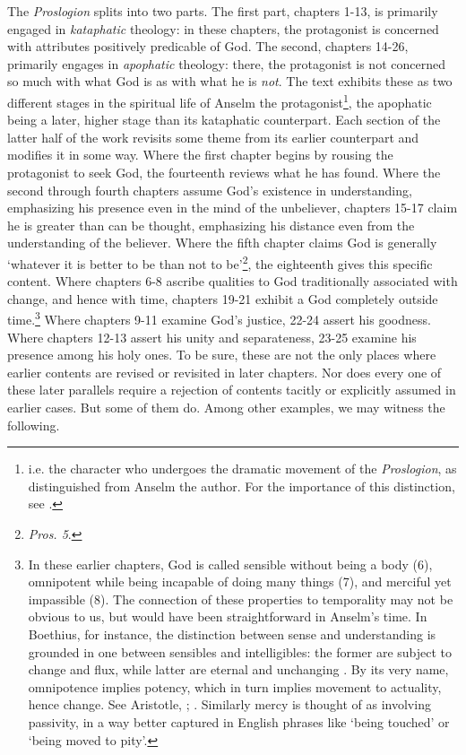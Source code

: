 \documentclass[]{amsart}
\begin{document}
The \textit{Proslogion} splits into two parts. The first part, chapters 1-13, is primarily engaged in \textit{kataphatic} theology: in these chapters, the protagonist is concerned with attributes positively predicable of God. The second, chapters 14-26, primarily engages in \textit{apophatic} theology: there, the protagonist is not concerned so much with what God is as with what he is \textit{not}. The text exhibits these as two different stages in the spiritual life of Anselm the protagonist\footnote{i.e. the character who undergoes the dramatic movement of the \textit{Proslogion}, as distinguished from Anselm the author. For the importance of this distinction, see \cite{McMahon2004}.}, the apophatic being a later, higher stage than its kataphatic counterpart. Each section of the latter half of the work revisits some theme from its earlier counterpart and modifies it in some way. Where the first chapter begins by rousing the protagonist to seek God, the fourteenth reviews what he has found. Where the second through fourth chapters assume God's existence in understanding, emphasizing his presence even in the mind of the unbeliever, chapters 15-17 claim he is greater than can be thought, emphasizing his distance even from the understanding of the believer. Where the fifth chapter claims God is generally `whatever it is better to be than not to be'\footnote{\textit{Pros. 5}.}, the eighteenth gives this specific content. Where chapters 6-8 ascribe qualities to God traditionally associated with change, and hence with time, chapters 19-21 exhibit a God completely outside time.\footnote{In these earlier chapters, God is called sensible without being a body (6), omnipotent while being incapable of doing many things (7), and merciful yet impassible (8). The connection of these properties to temporality may not be obvious to us, but would have been straightforward in Anselm's time. In Boethius, for instance, the distinction between sense and understanding is grounded in one between sensibles and intelligibles: the former are subject to change and flux, while latter are eternal and unchanging \cite[BCP 82BC]{BCP}. By its very name, omnipotence implies potency, which in turn implies movement to actuality, hence change. See Aristotle, \cite[\textit{Metaph.} $\Theta$, 1045b 27-1046a 35]{Metaph}; \cite[\textit{in metaph.} 9, lec. 1]{AquinasMetaph}. Similarly mercy is thought of as involving passivity, in a way better captured in English phrases like `being touched' or `being moved to pity'.} Where chapters 9-11 examine God's justice, 22-24 assert his goodness. Where chapters 12-13 assert his unity and separateness, 23-25 examine his presence among his holy ones. To be sure, these are not the only places where earlier contents are revised or revisited in later chapters. Nor does every one of these later parallels require a rejection of contents tacitly or explicitly assumed in earlier cases. But some of them do. Among other examples, we may witness the following.
\end{document}
